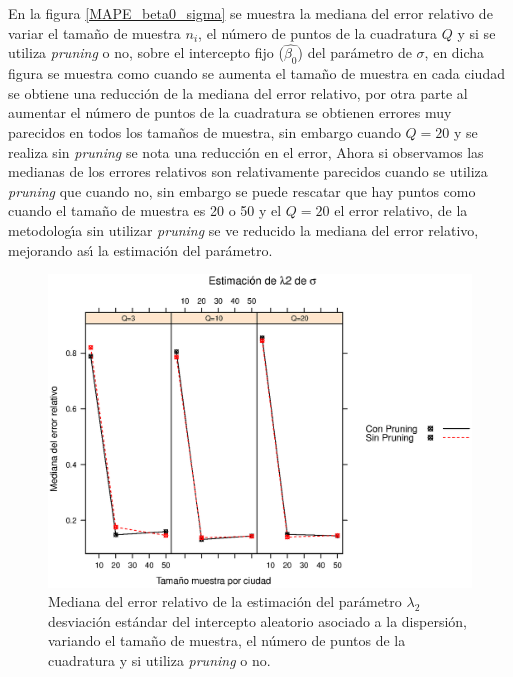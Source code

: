 En la figura \ref{MAPE_beta0_sigma} se muestra la mediana del error relativo de variar el tama\~{n}o de muestra $n_i$, el n\'{u}mero de puntos de la cuadratura $Q$ y si se utiliza \textit{pruning} o no, sobre el intercepto fijo ($\hat{\beta_0}$) del par\'{a}metro de $\sigma$, en dicha figura se muestra como cuando se aumenta el tama\~{n}o de muestra en cada ciudad se obtiene una reducci\'{o}n de la mediana del error relativo, por otra parte al aumentar el n\'{u}mero de puntos de la cuadratura se obtienen errores muy parecidos en todos los tama\~{n}os de muestra, sin embargo cuando $Q=20$ y se realiza sin \textit{pruning} se nota una reducci\'{o}n en el error, Ahora si observamos las medianas de los errores relativos son relativamente parecidos cuando se utiliza \textit{pruning} que cuando no, sin embargo se puede rescatar que hay puntos como cuando el tama\~{n}o de muestra es 20 o 50 y el $Q=20$ el error relativo, de la metodolog\'{\i}a sin utilizar \textit{pruning} se ve reducido la mediana del error relativo, mejorando as\'{\i} la estimaci\'{o}n del par\'{a}metro.\\

\begin{figure}
	\begin{center}
		\includegraphics[scale=0.6]{MAPE_lambda2_sigma.eps}	
		\caption{Mediana del error relativo de la estimaci\'{o}n del par\'{a}metro $\lambda_2$ desviaci\'{o}n est\'{a}ndar del intercepto aleatorio asociado a la dispersi\'{o}n, variando el tama\~{n}o de muestra, el n\'{u}mero de puntos de la cuadratura y si utiliza \textit{pruning} o no.}
		\label{MAPE_lambda2_sigma}
	\end{center}
\end{figure}

